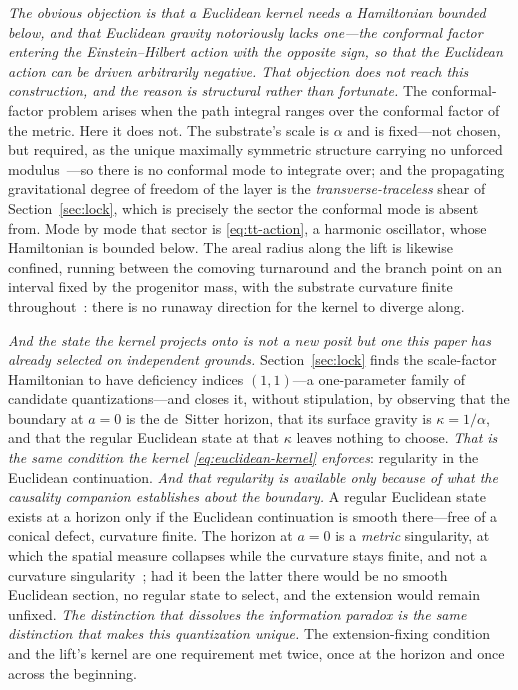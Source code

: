 \documentclass[11pt,a4paper]{article}
\theoremstyle{plain}
\theoremstyle{definition}
\theoremstyle{remark}
\begin{document}
\emph{The obvious objection is that a Euclidean kernel needs a Hamiltonian bounded below, and that Euclidean
gravity notoriously lacks one---the conformal factor entering the Einstein--Hilbert action with the opposite
sign, so that the Euclidean action can be driven arbitrarily negative. \emph{That objection does not reach this
construction, and the reason is structural rather than fortunate.}} The conformal-factor problem arises when the
path integral ranges over the conformal factor of the metric. Here it does not. The substrate's scale is
$\alpha$ and is fixed---not chosen, but required, as the unique maximally symmetric structure carrying no
unforced modulus~\cite{JanzenShadowExistence, JanzenSlicing}---so there is no conformal mode to integrate over;
and the propagating gravitational degree of freedom of the layer is the \emph{transverse-traceless} shear of
Section~\ref{sec:lock}, which is precisely the sector the conformal mode is absent from. Mode by mode that
sector is \eqref{eq:tt-action}, a harmonic oscillator, whose Hamiltonian is bounded below. The areal radius
along the lift is likewise confined, running between the comoving turnaround and the branch point on an
interval fixed by the progenitor mass, with the substrate curvature finite throughout~\cite{JanzenCRframework,
JanzenCircle}: there is no runaway direction for the kernel to diverge along.

\emph{And the state the kernel projects onto is not a new posit but one this paper has already selected on
independent grounds.} Section~\ref{sec:lock} finds the scale-factor Hamiltonian to have deficiency indices
$(1,1)$---a one-parameter family of candidate quantizations---and closes it, without stipulation, by observing
that the boundary at $a=0$ is the de~Sitter horizon, that its surface gravity is $\kappa=1/\alpha$, and that the
regular Euclidean state at that $\kappa$ leaves nothing to choose. \emph{That is the same condition the kernel
\eqref{eq:euclidean-kernel} enforces}: regularity in the Euclidean continuation. \emph{And that regularity is available only because of what the causality companion establishes about the boundary.} A regular Euclidean state exists at a horizon only if the Euclidean continuation is smooth there---free of a conical defect, curvature finite. The horizon at $a=0$ is a \emph{metric} singularity, at which the spatial measure collapses while the curvature stays finite, and not a curvature singularity~\cite{JanzenBHcausality}; had it been the latter there would be no smooth Euclidean section, no regular state to select, and the extension would remain unfixed. \emph{The distinction that dissolves the information paradox is the same distinction that makes this quantization unique.} The extension-fixing condition
and the lift's kernel are one requirement met twice, once at the horizon and once across the beginning.
\end{document}
